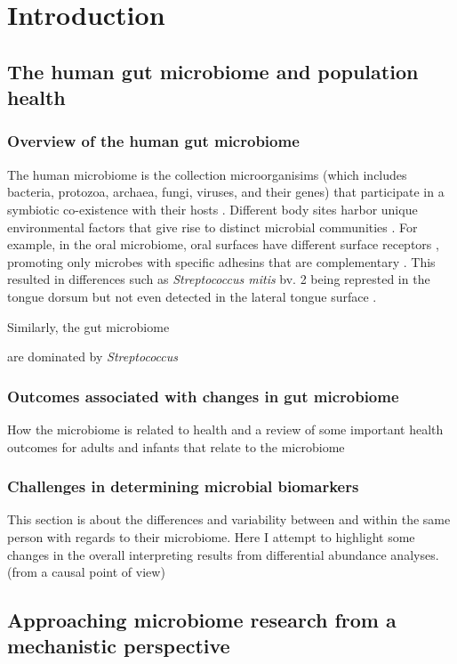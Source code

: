 \chapter{Introduction}

\section{The human gut microbiome and population health}
\subsection{Overview of the human gut microbiome}

The human microbiome is the collection microorganisims (which includes bacteria, protozoa, archaea, fungi, viruses, and their genes) that participate in a symbiotic co-existence with their hosts \cite{ursell2012defining}.  Different body sites harbor unique environmental factors that give rise to distinct microbial communities \cite{consortium2012structure}. For example, in the oral microbiome, oral surfaces have different surface receptors \cite{gibbons1989bacterial}, promoting only microbes with specific adhesins that are complementary \cite{aas2005defining}. This resulted in differences such as \emph{Streptococcus mitis} bv. 2 being represted in the tongue dorsum but not even detected in the lateral tongue surface \cite{aas2005defining}. 

Similarly, the gut microbiome 


are dominated by \emph{Streptococcus} 

\subsection{Outcomes associated with changes in gut microbiome}
How the microbiome is related to health and a review of some important health outcomes for adults and infants that relate to the microbiome


\subsection{Challenges in determining microbial biomarkers}
This section is about the differences and variability between and within the same person with regards to their microbiome. Here I attempt to highlight some changes in the overall interpreting results from differential abundance analyses. (from a causal point of view)


\section{Approaching microbiome research from a mechanistic perspective}

